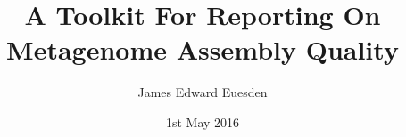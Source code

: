 
\title{A Toolkit For Reporting On Metagenome Assembly Quality}

\author{James Edward Euesden}




\date{1st May 2016} %




\maketitle



